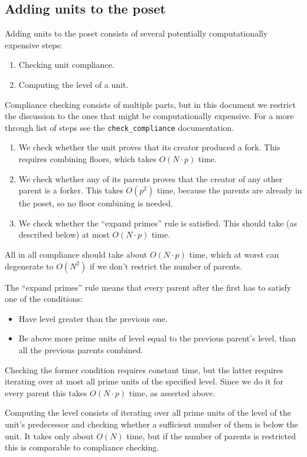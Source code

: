 \documentclass[a4paper,10pt]{article}
\begin{document}
		\subsection{Adding units to the poset}
		 \label{sec:adding}
		 Adding units to the poset consists of several potentially computationally expensive steps:
			\begin{enumerate}
				\item Checking unit compliance.
				\item Computing the level of a unit.
			\end{enumerate}

			Compliance checking consists of multiple parts, but in this document we restrict the discussion to the ones that might be computationally expensive.
			For a more through list of steps see the \lstinline{check_compliance} documentation.
			\begin{enumerate}
				\item We check whether the unit proves that its creator produced a fork. This requires combining floors, which takes $O(N \cdot p)$ time.
				\item We check whether any of its parents proves that the creator of any other parent is a forker. This takes $O(p^2)$ time,
					because the parents are already in the poset, so no floor combining is needed.
				\item We check whether the ``expand primes'' rule is satisfied. This should take (as described below) at most $O(N \cdot p)$ time.
			\end{enumerate}
			All in all compliance should take about $O(N \cdot p)$ time, which at worst can degenerate to $O(N^2)$ if we don't restrict the number of parents.

			The ``expand primes'' rule means that every parent after the first has to satisfy one of the conditions:
			\begin{itemize}
				\item Have level greater than the previous one.
				\item Be above more prime units of level equal to the previous parent's level, than all the previous parents combined.
			\end{itemize}
			Checking the former condition requires constant time, but the latter requires iterating over at most all prime units of the specified level.
			Since we do it for every parent this takes $O(N \cdot p)$ time, as asserted above.

			Computing the level consists of iterating over all prime units of the level of the unit's predecessor and checking whether a sufficient number of them is below the unit.
			It takes only about $O(N)$ time, but if the number of parents is restricted this is comparable to compliance checking.
\end{document}
